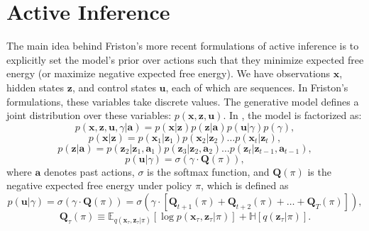 \chapter{Active Inference}
\label{chap: active inference}

The main idea behind Friston's more recent formulations of active inference is to explicitly set the model's prior over actions such that they minimize expected free energy (or maximize negative expected free energy). We have observations $\mathbf{x}$, hidden states $\mathbf{z}$, and control states $\mathbf{u}$, each of which are sequences. In Friston's formulations, these variables take discrete values. The generative model defines a joint distribution over these variables: $p (\mathbf{x}, \mathbf{z}, \mathbf{u})$. In \cite{friston2015active}, the model is factorized as:
\begin{equation}
    p (\mathbf{x}, \mathbf{z}, \mathbf{u}, \gamma | \mathbf{a}) = p(\mathbf{x} | \mathbf{z}) p(\mathbf{z} | \mathbf{a}) p(\mathbf{u} | \gamma) p(\gamma),
\end{equation}
\begin{equation}
    p(\mathbf{x} | \mathbf{z}) = p(\mathbf{x}_1 | \mathbf{z}_1) p(\mathbf{x}_2 | \mathbf{z}_2) \dots p(\mathbf{x}_t | \mathbf{z}_t),
\end{equation}
\begin{equation}
    p(\mathbf{z} | \mathbf{a}) = p(\mathbf{z}_2 | \mathbf{z}_1 , \mathbf{a}_1) p(\mathbf{z}_3 | \mathbf{z}_2 , \mathbf{a}_2) \dots p(\mathbf{z}_t | \mathbf{z}_{t-1} , \mathbf{a}_{t-1}),
\end{equation}
\begin{equation}
    p(\mathbf{u} | \gamma) = \sigma (\gamma \cdot \mathbf{Q} (\pi)),
\end{equation}
where $\mathbf{a}$ denotes past actions, $\sigma$ is the softmax function, and $\mathbf{Q} (\pi)$ is the negative expected free energy under policy $\pi$, which is defined as
\begin{equation}
    p(\mathbf{u} | \gamma) = \sigma (\gamma \cdot \mathbf{Q} (\pi)) = \sigma (\gamma \cdot \left[ \mathbf{Q}_{t+1} (\pi) + \mathbf{Q}_{t+2} (\pi) + \dots + \mathbf{Q}_T (\pi) \right] ),
\end{equation}
\begin{equation}
    \mathbf{Q}_\tau (\pi) \equiv \mathbb{E}_{q (\mathbf{x}_\tau , \mathbf{z}_\tau | \pi)} \left[ \log p(\mathbf{x}_\tau , \mathbf{z}_\tau | \pi) \right] + \mathbb{H} \left[ q (\mathbf{z}_\tau | \pi) \right].
\end{equation}
